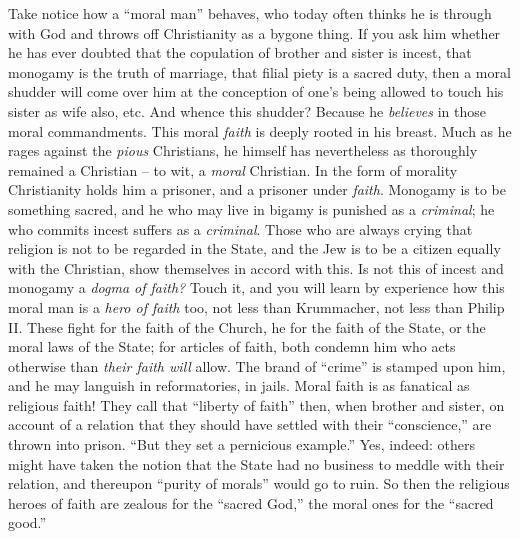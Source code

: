 Take notice how a ``moral man'' behaves, who today often thinks he is 
through with God and throws off Christianity as a bygone thing. If you ask him 
whether he has ever doubted that the copulation of brother and sister is 
incest, that monogamy is the truth of marriage, that filial piety is a sacred 
duty, then a moral shudder will come over him at the conception of one's being 
allowed to touch his sister as wife also, etc. And whence this shudder? 
Because he \textit{believes} in those moral commandments. This moral 
\textit{faith} is deeply rooted in his breast. Much as he rages against the 
\textit{pious} Christians, he himself has nevertheless as thoroughly remained 
a Christian -- to wit, a \textit{moral} Christian. In the form of morality 
Christianity holds him a prisoner, and a prisoner under \textit{faith}. 
Monogamy is to be something sacred, and he who may live in bigamy is punished 
as a \textit{criminal}; he who commits incest suffers as a \textit{criminal}. 
Those who are always crying that religion is not to be regarded in the State, 
and the Jew is to be a citizen equally with the Christian, show themselves in 
accord with this. Is not this of incest and monogamy a \textit{dogma of 
faith?} Touch it, and you will learn by experience how this moral man is a 
\textit{hero of faith} too, not less than Krummacher, not less than Philip II. 
These fight for the faith of the Church, he for the faith of the State, or the 
moral laws of the State; for articles of faith, both condemn him who acts 
otherwise than \textit{their faith will} allow. The brand of ``crime'' is 
stamped upon him, and he may languish in reformatories, in jails. Moral faith 
is as fanatical as religious faith! They call that ``liberty of faith'' 
then, when brother and sister, on account of a relation that they should have 
settled with their ``conscience,'' are thrown into prison. ``But they set a 
pernicious example.'' Yes, indeed: others might have taken the notion that 
the State had no business to meddle with their relation, and thereupon 
``purity of morals'' would go to ruin. So then the religious heroes of faith 
are zealous for the ``sacred God,'' the moral ones for the ``sacred 
good.''

